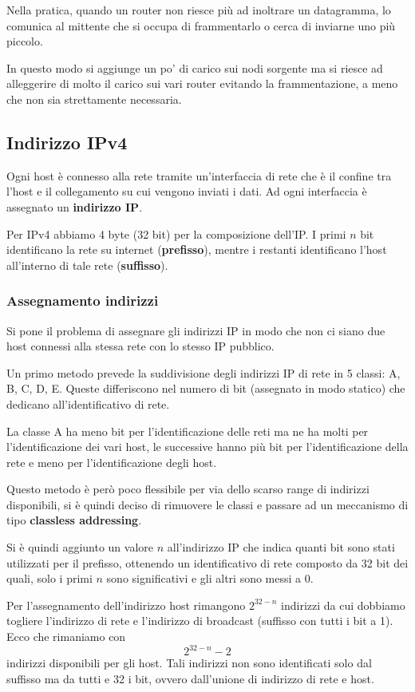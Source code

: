 Nella pratica, quando un router non riesce più ad inoltrare un
datagramma, lo comunica al mittente che si occupa di frammentarlo o
cerca di inviarne uno più piccolo.

In questo modo si aggiunge un po' di carico sui nodi sorgente ma si
riesce ad alleggerire di molto il carico sui vari router evitando
la frammentazione, a meno che non sia strettamente necessaria.

\subsection{Indirizzo IPv4}
Ogni host è connesso alla rete tramite un'interfaccia di rete che è il
confine tra l'host e il collegamento su cui vengono inviati i dati. 
Ad ogni interfaccia è assegnato un \textbf{indirizzo IP}.

Per IPv4 abbiamo 4 byte (32 bit) per la composizione dell'IP. I primi 
$n$ bit identificano la rete su internet (\textbf{prefisso}), mentre 
i restanti identificano l'host all'interno di tale rete 
(\textbf{suffisso}).

\subsubsection{Assegnamento indirizzi}
Si pone il problema di assegnare gli indirizzi IP in modo che non ci
siano due host connessi alla stessa rete con lo stesso IP pubblico.

Un primo metodo prevede la suddivisione degli indirizzi IP di rete in 
5 classi: A, B, C, D, E. Queste differiscono nel numero di bit
(assegnato in modo statico) che dedicano all'identificativo di rete.

La classe A ha meno bit per l'identificazione delle reti ma ne ha
molti per l'identificazione dei vari host, le successive hanno più bit
per l'identificazione della rete e meno per l'identificazione degli
host.

Questo metodo è però poco flessibile per via dello scarso range di 
indirizzi disponibili, si è quindi deciso di rimuovere le classi e
passare ad un meccanismo di tipo \textbf{classless addressing}.

Si è quindi aggiunto un valore $n$ all'indirizzo IP che indica quanti 
bit sono stati utilizzati per il prefisso, ottenendo un identificativo
di rete composto da 32 bit dei quali, solo i primi $n$ sono 
significativi e gli altri sono messi a 0.

Per l'assegnamento dell'indirizzo host rimangono $2^{32-n}$ indirizzi 
da cui dobbiamo togliere l'indirizzo di rete e l'indirizzo di
broadcast (suffisso con tutti i bit a 1). Ecco che rimaniamo con
\[ 2^{32-n}-2 \]
indirizzi disponibili per gli host. Tali indirizzi non sono 
identificati solo dal suffisso ma da tutti e 32 i bit, ovvero 
dall'unione di indirizzo di rete e host.

